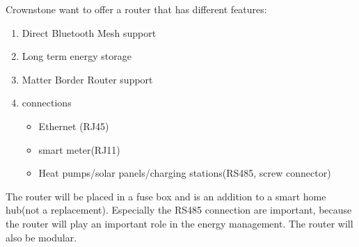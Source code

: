 Crownstone want to offer a router that has different features:\\
\begin{enumerate}
    \item Direct Bluetooth Mesh support
    \item Long term energy storage
    \item Matter Border Router support
    \item connections 
    \begin{itemize}
        \item Ethernet (RJ45)
        \item smart meter(RJ11)
        \item Heat pumps/solar panels/charging stations(RS485, screw connector)\\
    \end{itemize}
\end{enumerate}
The router will be placed in a fuse box and is an addition to a smart home hub(not a replacement). Especially the RS485 connection are important, because the router will play an important role in the energy management. The router will also be modular.
